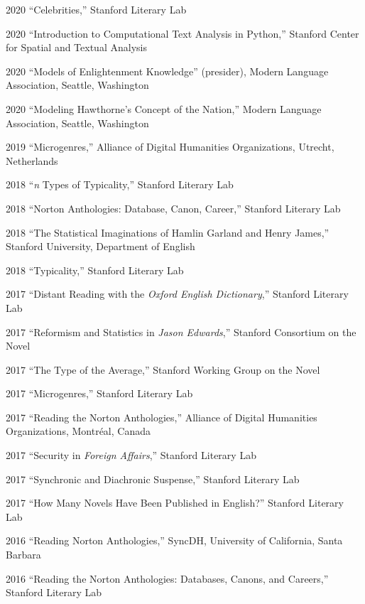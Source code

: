 \documentclass[12pt,letterpaper]{report}
\begin{document}
\begin{tablist}
	\item[2020] \tab{}\enquote{Celebrities,} Stanford Literary Lab
	\item[2020] \tab{}\enquote{Introduction to Computational Text Analysis in Python,} Stanford Center for Spatial and Textual Analysis
	\item[2020] \tab{}\enquote{Models of Enlightenment Knowledge} (presider), Modern Language Association, Seattle, Washington
	\item[2020] \tab{}\enquote{Modeling Hawthorne's Concept of the Nation,} Modern Language Association, Seattle, Washington
	\item[2019] \tab{}\enquote{Microgenres,} Alliance of Digital Humanities Organizations, Utrecht, Netherlands
	\item[2018] \tab{}\enquote{\emph{n} Types of Typicality,} Stanford Literary Lab
	\item[2018] \tab{}\enquote{Norton Anthologies: Database, Canon, Career,} Stanford Literary Lab
	\item[2018] \tab{}\enquote{The Statistical Imaginations of Hamlin Garland and Henry James,} Stanford University, Department of English
	\item[2018] \tab{}\enquote{Typicality,} Stanford Literary Lab
	\item[2017] \tab{}\enquote{Distant Reading with the \emph{Oxford English Dictionary},} Stanford Literary Lab
	\item[2017] \tab{}\enquote{Reformism and Statistics in \emph{Jason Edwards},} Stanford Consortium on the Novel
	\item[2017] \tab{}\enquote{The Type of the Average,} Stanford Working Group on the Novel
	\item[2017] \tab{}\enquote{Microgenres,} Stanford Literary Lab
	\item[2017] \tab{}\enquote{Reading the Norton Anthologies,} Alliance of Digital Humanities Organizations, Montréal, Canada
	\item[2017] \tab{}\enquote{Security in \emph{Foreign Affairs},} Stanford Literary Lab
	\item[2017] \tab{}\enquote{Synchronic and Diachronic Suspense,} Stanford Literary Lab
	\item[2017] \tab{}\enquote{How Many Novels Have Been Published in English?} Stanford Literary Lab
	\item[2016] \tab{}\enquote{Reading Norton Anthologies,} SyncDH, University of California, Santa Barbara
	\item[2016] \tab{}\enquote{Reading the Norton Anthologies: Databases, Canons, and Careers,} Stanford Literary Lab

\end{tablist}
\end{document}
